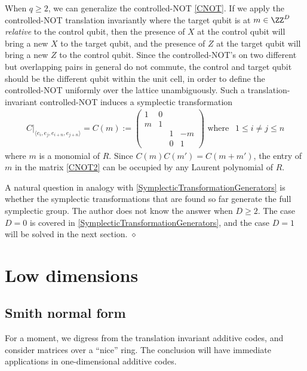 When $q \ge 2$, we can generalize the controlled-NOT \eqref{CNOT}.
If we apply the controlled-NOT translation invariantly 
where the target qubit is at $m \in \ZZ^D$
{\em relative} to the control qubit,
then the presence of $X$ at the control qubit will bring a new $X$ to the target qubit,
and the presence of $Z$ at the target qubit will bring a new $Z$ to the control qubit.
Since the controlled-NOT's on two different but overlapping pairs in general do not commute,
the control and target qubit should be the different qubit within the unit cell,
in order to define the controlled-NOT uniformly over the lattice unambiguously.
Such a translation-invariant controlled-NOT induces a symplectic transformation
\begin{align}
 C|_{\langle e_i , e_j , e_{i+n} , e_{j+n} \rangle } = C(m) :=
\begin{pmatrix}
 1 & 0 & & \\
 m & 1 & & \\
  &  & 1 & -m \\
  &  & 0 & 1
\end{pmatrix} \text{ where }~~1 \le i \neq j \le n
\label{CNOT2}
\end{align}
where $m$ is a monomial of $R$.
Since $C(m)C(m') = C(m+m')$,
the entry of $m$ in the matrix \eqref{CNOT2} 
can be occupied by any Laurent polynomial of $R$.

\begin{rem}
A natural question in analogy with \ref{SymplecticTransformationGenerators}
is whether the symplectic transformations that are found so far
generate the full symplectic group.
The author does not know the answer when $D \ge 2$.
The case $D=0$ is covered in \ref{SymplecticTransformationGenerators},
and the case $D=1$ will be solved in the next section.
\hfill $\diamond$ \end{rem}

\section{Low dimensions}

\subsection{Smith normal form}

For a moment, we digress from the translation invariant additive codes,
and consider matrices over a ``nice'' ring.
The conclusion will have immediate applications in one-dimensional additive codes.

